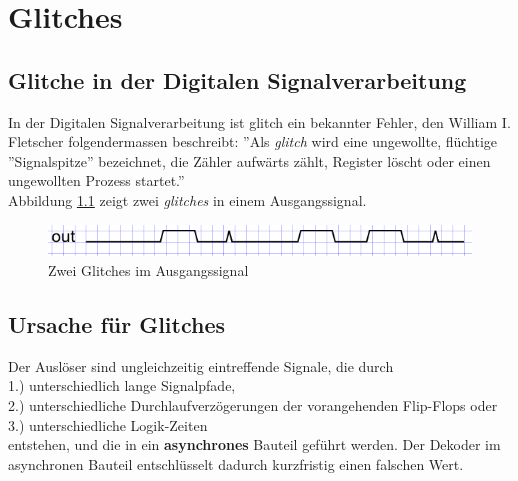 
\chapter{Glitches}\label{chap.glitch}

\section{Glitche in der Digitalen Signalverarbeitung}\label{sect.glitch_def}
In der Digitalen Signalverarbeitung ist glitch ein bekannter Fehler, den William I. Fletscher folgendermassen beschreibt: ''Als \textit{glitch}  wird eine ungewollte, flüchtige ''Signalspitze'' bezeichnet, die Zähler aufwärts zählt, Register löscht oder einen ungewollten Prozess startet.'' \cite{F_glitches} \\


Abbildung \ref{fig.glitch.def} zeigt zwei \textit{glitches} in einem Ausgangssignal.\\

\begin{figure}[H]
	\includegraphics[width=\textwidth]{images/glitch/def_glitch_1.png}
	\caption{Zwei Glitches im Ausgangssignal}
	\label{fig.glitch.def}
\end{figure}


\section{Ursache für Glitches}\label{sect.glitch_ursache}
Der Auslöser sind ungleichzeitig eintreffende Signale, die durch \\
1.) unterschiedlich lange Signalpfade, \\
2.) unterschiedliche Durchlaufverzögerungen der vorangehenden Flip-Flops oder \\
3.) unterschiedliche Logik-Zeiten \\
entstehen, und die in ein \textbf{asynchrones} Bauteil geführt werden. Der Dekoder im asynchronen Bauteil entschlüsselt dadurch kurzfristig einen falschen Wert. \\

